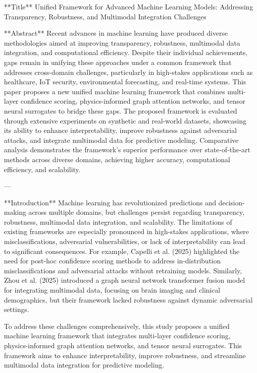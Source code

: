 **Title**  
Unified Framework for Advanced Machine Learning Models: Addressing Transparency, Robustness, and Multimodal Integration Challenges  

**Abstract**  
Recent advances in machine learning have produced diverse methodologies aimed at improving transparency, robustness, multimodal data integration, and computational efficiency. Despite their individual achievements, gaps remain in unifying these approaches under a common framework that addresses cross-domain challenges, particularly in high-stakes applications such as healthcare, IoT security, environmental forecasting, and real-time systems. This paper proposes a new unified machine learning framework that combines multi-layer confidence scoring, physics-informed graph attention networks, and tensor neural surrogates to bridge these gaps. The proposed framework is evaluated through extensive experiments on synthetic and real-world datasets, showcasing its ability to enhance interpretability, improve robustness against adversarial attacks, and integrate multimodal data for predictive modeling. Comparative analysis demonstrates the framework's superior performance over state-of-the-art methods across diverse domains, achieving higher accuracy, computational efficiency, and scalability.  

---

**Introduction**  
Machine learning has revolutionized predictions and decision-making across multiple domains, but challenges persist regarding transparency, robustness, multimodal data integration, and scalability. The limitations of existing frameworks are especially pronounced in high-stakes applications, where misclassifications, adversarial vulnerabilities, or lack of interpretability can lead to significant consequences. For example, Capelli et al. (2025) highlighted the need for post-hoc confidence scoring methods to address in-distribution misclassifications and adversarial attacks without retraining models. Similarly, Zhou et al. (2025) introduced a graph neural network transformer fusion model for integrating multimodal data, focusing on brain imaging and clinical demographics, but their framework lacked robustness against dynamic adversarial settings.  

To address these challenges comprehensively, this study proposes a unified machine learning framework that integrates multi-layer confidence scoring, physics-informed graph attention networks, and tensor neural surrogates. This framework aims to enhance interpretability, improve robustness, and streamline multimodal data integration for predictive modeling.  

